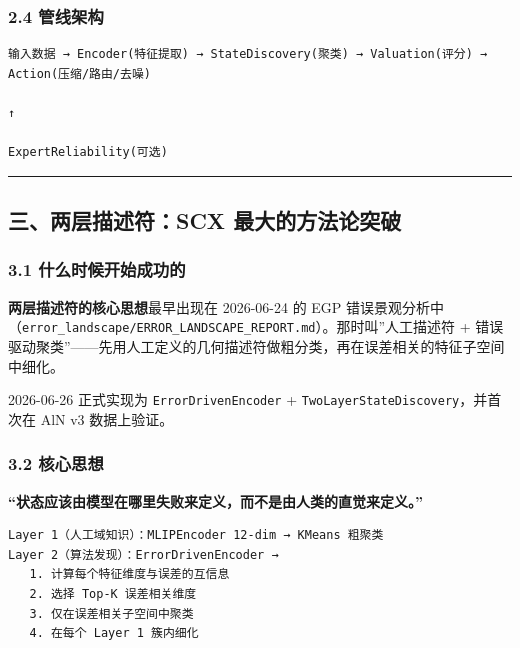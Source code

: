 \documentclass[
  12pt,
]{ctexart}
\begin{document}
\subsubsection{2.4 管线架构}\label{ux7ba1ux7ebfux67b6ux6784}

\begin{verbatim}
输入数据 → Encoder(特征提取) → StateDiscovery(聚类) → Valuation(评分) → Action(压缩/路由/去噪)
                                                                      ↑
                                                            ExpertReliability(可选)
\end{verbatim}

\begin{center}\rule{0.5\linewidth}{0.5pt}\end{center}

\subsection{三、两层描述符：SCX
最大的方法论突破}\label{ux4e09ux4e24ux5c42ux63cfux8ff0ux7b26scx-ux6700ux5927ux7684ux65b9ux6cd5ux8bbaux7a81ux7834}

\subsubsection{3.1
什么时候开始成功的}\label{ux4ec0ux4e48ux65f6ux5019ux5f00ux59cbux6210ux529fux7684}

\textbf{两层描述符的核心思想}最早出现在 2026-06-24 的 EGP
错误景观分析中（\texttt{error\_landscape/ERROR\_LANDSCAPE\_REPORT.md}）。那时叫''人工描述符
+
错误驱动聚类''------先用人工定义的几何描述符做粗分类，再在误差相关的特征子空间中细化。

2026-06-26 正式实现为 \texttt{ErrorDrivenEncoder} +
\texttt{TwoLayerStateDiscovery}，并首次在 AlN v3 数据上验证。

\subsubsection{3.2 核心思想}\label{ux6838ux5fc3ux601dux60f3}

\textbf{``状态应该由模型在哪里失败来定义，而不是由人类的直觉来定义。''}

\begin{verbatim}
Layer 1（人工域知识）：MLIPEncoder 12-dim → KMeans 粗聚类
Layer 2（算法发现）：ErrorDrivenEncoder →
   1. 计算每个特征维度与误差的互信息
   2. 选择 Top-K 误差相关维度
   3. 仅在误差相关子空间中聚类
   4. 在每个 Layer 1 簇内细化
\end{verbatim}
\end{document}
